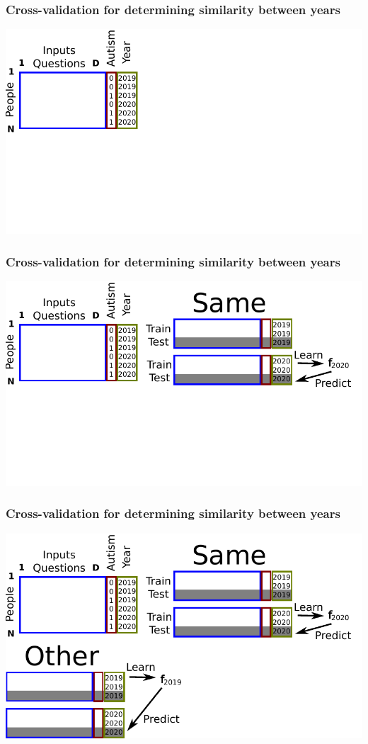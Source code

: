 \documentclass{beamer}
\begin{document}
\begin{frame}
  \frametitle{Cross-validation for determining similarity between years}
  \includegraphics[width=\textwidth]{drawing-cv-same-other-years-1.pdf}
\end{frame}

\begin{frame}
  \frametitle{Cross-validation for determining similarity between years}
  \includegraphics[width=\textwidth]{drawing-cv-same-other-years-2.pdf}
\end{frame}

\begin{frame}
  \frametitle{Cross-validation for determining similarity between years}
  \includegraphics[width=\textwidth]{drawing-cv-same-other-years-3.pdf}
\end{frame}
\end{document}
